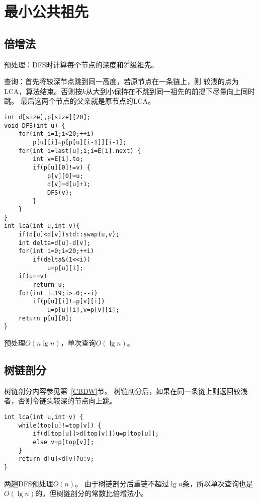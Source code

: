 \section{最小公共祖先}
\subsection{倍增法}
预处理：DFS时计算每个节点的深度和$2^k$级祖先。

查询：首先将较深节点跳到同一高度，若原节点在一条链上，则
较浅的点为LCA，算法结束。否则按$k$从大到小保持在不跳到同一祖先的前提下尽量向上同时跳。
最后这两个节点的父亲就是原节点的LCA。

\begin{lstlisting}
int d[size],p[size][20];
void DFS(int u) {
    for(int i=1;i<20;++i)
        p[u][i]=p[p[u][i-1]][i-1];
    for(int i=last[u];i;i=E[i].next) {
        int v=E[i].to;
        if(p[u][0]!=v) {
            p[v][0]=u;
            d[v]=d[u]+1;
            DFS(v);
        }
    }
}
int lca(int u,int v){
    if(d[u]<d[v])std::swap(u,v);
    int delta=d[u]-d[v];
    for(int i=0;i<20;++i)
        if(delta&(1<<i))
            u=p[u][i];
    if(u==v)
        return u;
    for(int i=19;i>=0;--i)
        if(p[u][i]!=p[v][i])
            u=p[u][i],v=p[v][i];
    return p[u][0];
}
\end{lstlisting}
预处理$O(n\lg n)$，单次查询$O(\lg n)$。
\subsection{树链剖分}
树链剖分内容参见第~\ref{CBDW}节。
树链剖分后，如果在同一条链上则返回较浅者，否则令链头较深的节点向上跳。

\begin{lstlisting}
int lca(int u,int v) {
    while(top[u]!=top[v]) {
        if(d[top[u]]>d[top[v]])u=p[top[u]];
        else v=p[top[v]];
    }
    return d[u]<d[v]?u:v;
}
\end{lstlisting}

两趟DFS预处理$O(n)$。
由于树链剖分后重链不超过$\lg n$条，所以单次查询也是$O(\lg n)$的，但树链剖分的常数比倍增法小。
